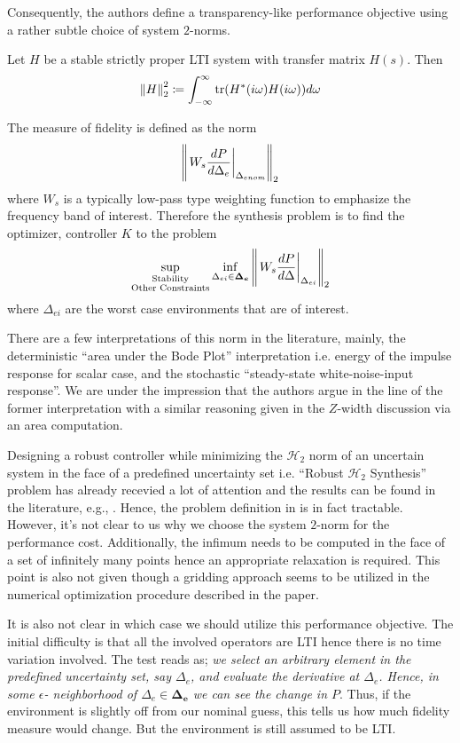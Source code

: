 Consequently, the authors define a transparency-like performance objective using a rather subtle choice of system $2$-norms. 

\begin{define*}Let $H$ be a stable strictly proper LTI system with transfer matrix $H(s)$. Then 
\[
\displaystyle \left\| H \right\|_2^2 \coloneqq \int_{-\infty}^\infty{\operatorname{tr}(H^*(i\omega)H(i\omega))}d\omega
\] 
\end{define*}
\noindent The measure of fidelity is defined as the norm
\[
\displaystyle \left\| \left.W_s\frac{dP}{d\Delta_e}\right|_{\Delta_{enom}} \right\|_2
\]
where $W_s$ is a typically low-pass type weighting function to emphasize the frequency band of interest. Therefore
the synthesis problem is to find the optimizer, controller $K$ to the problem
\[
\sup_{\substack{\text{Stability}\\\text{Other Constraints}}}\inf_{\Delta_{ei}\in\bm{\Delta_e}}
\displaystyle \left\| \left.W_s\frac{dP}{d\Delta}\right|_{\Delta_{ei}} \right\|_2
\]
where $\Delta_{ei}$ are the worst case environments that are of interest.


There are a few interpretations of this norm in the literature, mainly, the deterministic \enquote{area under the Bode
Plot} interpretation i.e. energy of the impulse response for scalar case, and the stochastic \enquote{steady-state 
white-noise-input response}. We are under the impression that the authors argue in the line of the former interpretation
with a similar reasoning given in the $Z$-width discussion via an area computation. 


Designing a robust controller while minimizing the $\mathcal{H}_2$ norm of an uncertain system in the face of a predefined 
uncertainty set i.e. \enquote{Robust $\mathcal{H}_2$ Synthesis} problem has already recevied a lot of attention and 
the results can be found in the literature, e.g., \cite{dullerud}. Hence, the problem definition in \cite{cavusoglu} is 
in fact tractable. However, it's not clear to us why we choose the system $2$-norm for the performance cost. Additionally, 
the infimum needs to be computed in the face of a set of infinitely many points hence an appropriate relaxation is required. 
This point is also not given though a gridding approach seems to be utilized in the numerical optimization procedure 
described in the paper.

It is also not clear in which case we should utilize this performance objective. The initial difficulty is that all the 
involved operators are LTI hence there is no time variation involved. The test reads as; \emph{we select an arbitrary element 
in the predefined uncertainty set, say $\Delta_e$, and evaluate the derivative at $\Delta_e$. Hence, in some $\epsilon$-
neighborhood of $\Delta_e\in\bm{\Delta_e}$ we can see the change in $P$}. Thus, if the environment is slightly off from our 
nominal guess, this tells us how much fidelity measure would change. But the environment is still assumed to be LTI.


